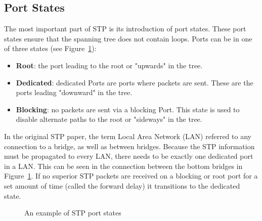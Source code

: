 \subsection*{Port States}
The most important part of STP is its introduction of port states.
These port states ensure that the spanning tree does not contain loops.
Ports can be in one of three states (see Figure~\ref{fig:port_states}):
\begin{itemize}
    \item \textbf{Root}: the port leading to the root or "upwards" in the tree.
    \item \textbf{Dedicated}: dedicated Ports are ports where packets are sent. These are the ports leading "downward" in the tree.
    \item \textbf{Blocking}: no packets are sent via a blocking Port.
        This state is used to disable alternate paths to the root or "sideways" in the tree.
\end{itemize}
In the original STP paper, the term Local Area Network (LAN) referred to any connection to a bridge, as well as between bridges.
Because the STP information must be propagated to every LAN, there needs to be exactly one dedicated port in a LAN.
This can be seen in the connection between the bottom bridges in Figure~\ref{fig:port_states}.
If no superior STP packets are received on a blocking or root port for a set amount of time (called the forward delay) it transitions to the dedicated state.
\begin{figure}[h]
    \centering
    \caption{An example of STP port states}
    \label{fig:port_states}
\end{figure}

